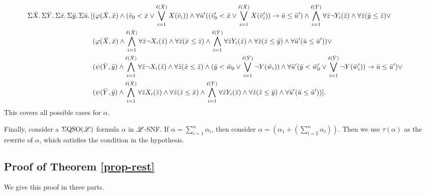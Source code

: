 \begin{align*}
\Sigma{\bar{X}}.\,\Sigma{\bar{Y}}.\,\Sigma{\bar{x}}.\,\Sigma{\bar{y}}.\,\Sigma{\bar{u}}.\,[&(\varphi(\bar{X},\bar{x})\wedge(\bar{v}_0 < \bar{x} \vee \bigvee_{i = 1}^{\ell(\bar{X})}X(\bar{v}_i))\wedge\forall\bar{u}'((\bar{v}_0' < \bar{x} \vee \bigvee_{i = 1}^{\ell(\bar{X})}X(\bar{v}_i'))\to\bar{u}\leq\bar{u}') \wedge\bigwedge_{i = 1}^{\ell(\bar{Y})} \forall\bar{z}\neg Y_i(\bar{z}) \wedge \forall\bar{z}(\bar{y}\leq\bar{z})\vee\\
&(\varphi(\bar{X},\bar{x})\wedge\bigwedge_{i = 1}^{\ell(\bar{X})} \forall\bar{z}\neg X_i(\bar{z}) \wedge \forall\bar{z}(\bar{x}\leq\bar{z})\wedge\bigwedge_{i = 1}^{\ell(\bar{Y})} \forall\bar{z} Y_i(\bar{z}) \wedge \forall\bar{z}(\bar{z}\leq\bar{y})\wedge\forall\bar{u}'(\bar{u}\leq\bar{u}'))\vee\\
&(\psi(\bar{Y},\bar{y})\wedge\bigwedge_{i = 1}^{\ell(\bar{X})} \forall\bar{z}\neg X_i(\bar{z}) \wedge \forall\bar{z}(\bar{x}\leq\bar{z})\wedge(\bar{y} < \bar{w}_0 \vee \bigvee_{i = 1}^{\ell(\bar{Y})}\neg Y(\bar{w}_i))\wedge\forall\bar{u}'(\bar{y} < \bar{w}_0' \vee \bigvee_{i = 1}^{\ell(\bar{Y})}\neg Y(\bar{w}_i'))\to\bar{u}\leq\bar{u}')\vee\\
&(\psi(\bar{Y},\bar{y})\wedge\bigwedge_{i = 1}^{\ell(\bar{X})} \forall\bar{z} X_i(\bar{z}) \wedge \forall\bar{z}(\bar{z}\leq\bar{x})\wedge\bigwedge_{i = 1}^{\ell(\bar{Y})} \forall\bar{z} Y_i(\bar{z}) \wedge \forall\bar{z}(\bar{z}\leq\bar{y})\wedge\forall\bar{u}'(\bar{u}\leq\bar{u}'))].
\end{align*}
This covers all possible cases for $\alpha$.

Finally, consider a $\Sigma{\rm QSO}(\mathscr{L})$ formula $\alpha$ in $\mathscr{L}$-SNF. If $\alpha = \sum_{i = 1}^n\alpha_i$, then consider $\alpha = (\alpha_1 + (\sum_{i = 2}^n\alpha_i))$. Then we use $\tau(\alpha)$ as the rewrite of $\alpha$, which satisfies the condition in the hypothesis.

\subsection*{Proof of Theorem \ref{prop-rest}}
We give this proof in three parts.

